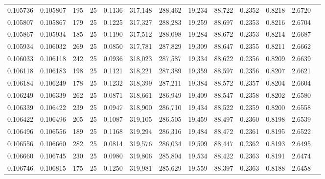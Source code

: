 \begin{tabular}{rrrrrrrrrrrrr}
0.105736 & 0.105807 &   195 &  25 &                                     0.1136 & 317,148 & 288,462 &  19,234 &  88,722 & 0.2352 & 0.8218 & 2.6720 \\
0.105807 & 0.105867 &   179 &  25 &                                     0.1225 & 317,327 & 288,283 &  19,259 &  88,697 & 0.2353 & 0.8216 & 2.6704 \\
0.105867 & 0.105934 &   185 &  25 &                                     0.1190 & 317,512 & 288,098 &  19,284 &  88,672 & 0.2353 & 0.8214 & 2.6687 \\
0.105934 & 0.106032 &   269 &  25 &                                     0.0850 & 317,781 & 287,829 &  19,309 &  88,647 & 0.2355 & 0.8211 & 2.6662 \\
0.106033 & 0.106118 &   242 &  25 &                                     0.0936 & 318,023 & 287,587 &  19,334 &  88,622 & 0.2356 & 0.8209 & 2.6639 \\
0.106118 & 0.106183 &   198 &  25 &                                     0.1121 & 318,221 & 287,389 &  19,359 &  88,597 & 0.2356 & 0.8207 & 2.6621 \\
0.106184 & 0.106249 &   178 &  25 &                                     0.1232 & 318,399 & 287,211 &  19,384 &  88,572 & 0.2357 & 0.8204 & 2.6604 \\
0.106249 & 0.106339 &   262 &  25 &                                     0.0871 & 318,661 & 286,949 &  19,409 &  88,547 & 0.2358 & 0.8202 & 2.6580 \\
0.106339 & 0.106422 &   239 &  25 &                                     0.0947 & 318,900 & 286,710 &  19,434 &  88,522 & 0.2359 & 0.8200 & 2.6558 \\
0.106422 & 0.106496 &   205 &  25 &                                     0.1087 & 319,105 & 286,505 &  19,459 &  88,497 & 0.2360 & 0.8198 & 2.6539 \\
0.106496 & 0.106556 &   189 &  25 &                                     0.1168 & 319,294 & 286,316 &  19,484 &  88,472 & 0.2361 & 0.8195 & 2.6522 \\
0.106556 & 0.106660 &   282 &  25 &                                     0.0814 & 319,576 & 286,034 &  19,509 &  88,447 & 0.2362 & 0.8193 & 2.6495 \\
0.106660 & 0.106745 &   230 &  25 &                                     0.0980 & 319,806 & 285,804 &  19,534 &  88,422 & 0.2363 & 0.8191 & 2.6474 \\
0.106746 & 0.106815 &   175 &  25 &                                     0.1250 & 319,981 & 285,629 &  19,559 &  88,397 & 0.2363 & 0.8188 & 2.6458 \\

\end{tabular}
